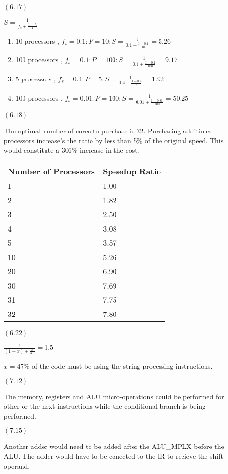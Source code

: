 \documentclass[letterpaper,10pt,titlepage]{article}
\begin{document}
\begin{enumerate}
\item[$(6.17)$]

$ S = \frac{1}{f_{s} + \frac{1-f_{s}}{P}} $ \\ 
\begin{enumerate}
\item 10 processors , $f_{s} = 0.1: P = 10 : S =  \frac{1}{0.1 + \frac{1-0.1}{10}} = 5.26$
\item 100 processors , $f_{s} = 0.1: P = 100 : S =  \frac{1}{0.1 + \frac{1-0.1}{100}} = 9.17$
\item 5 processors , $f_{s} = 0.4: P = 5 : S =  \frac{1}{0.4 + \frac{1-0.4}{5}} = 1.92$
\item 100 processors , $f_{s} = 0.01: P = 100 : S =  \frac{1}{0.01 + \frac{1-0.01}{100}} = 50.25$
\end{enumerate}

\item[$(6.18)$]

The optimal number of cores to purchase is 32. Purchasing additional processors increase's the ratio by less than 5\% of the original speed. This would constitute a 306\% increase in the cost.

\begin{tabular}{ll}
Number of Processors 	&	Speedup Ratio 	\\
\hline
	1					&	1.00			\\
	2					&	1.82			\\
	3					&	2.50			\\
	4					&	3.08			\\
	5					&	3.57			\\
	10					&	5.26			\\
	20					&	6.90			\\
	30					&	7.69			\\
	31					&	7.75			\\
	32					&	7.80			\\
\end{tabular}

\item[$(6.22)$]

$\frac{1}{(1 - x) + \frac{x}{3.5}} = 1.5$
  
$x = 47\%$ of the code must be using the string processing instructions.

\item[$(7.12)$]

The memory, registers and ALU micro-operations could be performed for other or the next instructions while the conditional branch is being performed. 

\item[$(7.15)$]

Another adder would need to be added after the ALU\_MPLX before the ALU. The adder would have to be conected to the IR to recieve the shift operand.

\end{enumerate}
\end{document}
